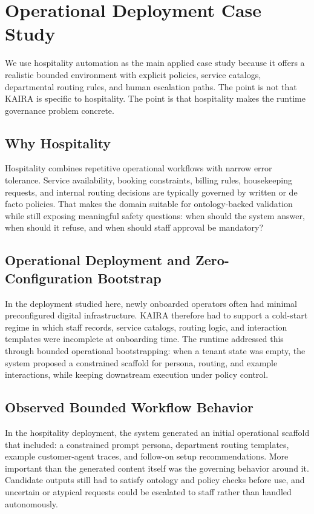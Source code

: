 \documentclass[11pt,a4paper]{article}
\begin{document}
\section{Operational Deployment Case Study}

We use hospitality automation as the main applied case study because it offers a realistic bounded environment with explicit policies, service catalogs, departmental routing rules, and human escalation paths. The point is not that KAIRA is specific to hospitality. The point is that hospitality makes the runtime governance problem concrete.

\subsection{Why Hospitality}
Hospitality combines repetitive operational workflows with narrow error tolerance. Service availability, booking constraints, billing rules, housekeeping requests, and internal routing decisions are typically governed by written or de facto policies. That makes the domain suitable for ontology-backed validation while still exposing meaningful safety questions: when should the system answer, when should it refuse, and when should staff approval be mandatory?

\subsection{Operational Deployment and Zero-Configuration Bootstrap}
In the deployment studied here, newly onboarded operators often had minimal preconfigured digital infrastructure. KAIRA therefore had to support a cold-start regime in which staff records, service catalogs, routing logic, and interaction templates were incomplete at onboarding time. The runtime addressed this through bounded operational bootstrapping: when a tenant state was empty, the system proposed a constrained scaffold for persona, routing, and example interactions, while keeping downstream execution under policy control.

\subsection{Observed Bounded Workflow Behavior}
In the hospitality deployment, the system generated an initial operational scaffold that included: a constrained prompt persona, department routing templates, example customer-agent traces, and follow-on setup recommendations. More important than the generated content itself was the governing behavior around it. Candidate outputs still had to satisfy ontology and policy checks before use, and uncertain or atypical requests could be escalated to staff rather than handled autonomously.
\end{document}
